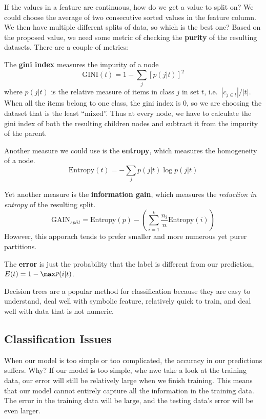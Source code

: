\documentclass[
  paper=a4,
,captions=tableheading
]{scrartcl}
\begin{document}
If the values in a feature are continuous, how do we get a value to
split on? We could choose the average of two consecutive sorted values
in the feature column. We then have multiple different splits of data,
so which is the best one? Based on the proposed value, we need some
metric of checking the \textbf{purity} of the resulting datasets. There
are a couple of metrics:

The \textbf{gini index} measures the impurity of a node \begin{equation}
    \textrm{GINI}(t) = 1 - \sum_{j}[p(j|t)]^{2}
\end{equation} where \(p(j|t)\) is the relative measure of items in
class \(j\) in set \(t\), i.e.~\(|c_{j\in t}| / |t|\). When all the
items belong to one class, the gini index is 0, so we are choosing the
dataset that is the least ``mixed''. Thus at every node, we have to
calculate the gini index of both the resulting children nodes and
subtract it from the impurity of the parent.

Another measure we could use is the \textbf{entropy}, which measures the
homogeneity of a node. \begin{equation}
    \textrm{Entropy}(t) = -\sum_{j}p(j|t)\log p(j|t)
\end{equation}

Yet another measure is the \textbf{information gain}, which measures the
\emph{reduction in entropy} of the resulting split. \begin{equation}
\textrm{GAIN}_{split} = \textrm{Entropy}(p) - (\sum_{i=1}^{k} \frac{n_{i}}{n}\textrm{Entropy}(i))
\end{equation} However, this apporach tends to prefer smaller and more
numerous yet purer partitions.

The \textbf{error} is just the probability that the label is different
from our prediction, \(E(t) = 1 - \maxP(i|t)\).

Decision trees are a popular method for classification because they are
easy to understand, deal well with symbolic feature, relatively quick to
train, and deal well with data that is not numeric.

\hypertarget{classification-issues}{%
\subsection{Classification Issues}\label{classification-issues}}

When our model is too simple or too complicated, the accuracy in our
predictions suffers. Why? If our model is too simple, whe nwe take a
look at the training data, our error will still be relatively large when
we finish training. This means that our model cannot entirely capture
all the information in the training data. The error in the training data
will be large, and the testing data's error will be even larger.
\end{document}
